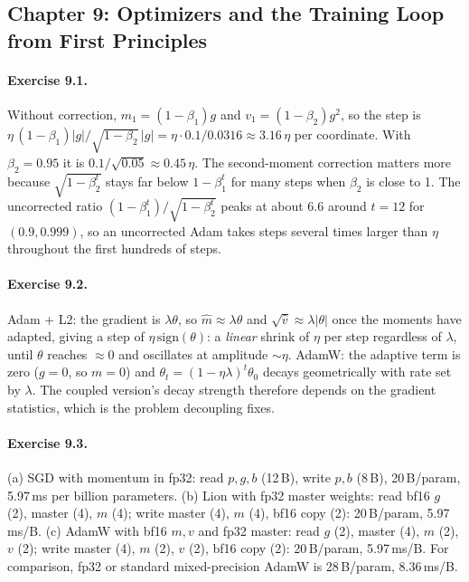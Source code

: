 \subsection*{Chapter 9: Optimizers and the Training Loop from First Principles}

\paragraph{Exercise 9.1.} Without correction, $m_1=(1-\beta_1)g$ and $v_1=(1-\beta_2)g^2$, so
the step is $\eta\,(1-\beta_1)|g|/\sqrt{1-\beta_2}\,|g| = \eta\cdot0.1/0.0316\approx3.16\,\eta$
per coordinate. With $\beta_2=0.95$ it is $0.1/\sqrt{0.05}\approx0.45\,\eta$. The second-moment
correction matters more because $\sqrt{1-\beta_2^t}$ stays far below $1-\beta_1^t$ for many
steps when $\beta_2$ is close to 1. The uncorrected ratio $(1-\beta_1^t)/\sqrt{1-\beta_2^t}$
peaks at about $6.6$ around $t=12$ for $(0.9, 0.999)$, so an uncorrected Adam takes steps
several times larger than $\eta$ throughout the first hundreds of steps.

\paragraph{Exercise 9.2.} Adam + L2: the gradient is $\lambda\theta$, so $\hat m\approx\lambda\theta$
and $\sqrt{\hat v}\approx\lambda|\theta|$ once the moments have adapted, giving a step of
$\eta\,\mathrm{sign}(\theta)$: a \emph{linear} shrink of $\eta$ per step regardless of $\lambda$,
until $\theta$ reaches $\approx0$ and oscillates at amplitude $\sim\eta$. AdamW: the adaptive
term is zero ($g=0$, so $m=0$) and $\theta_t=(1-\eta\lambda)^t\theta_0$ decays geometrically with
rate set by $\lambda$. The coupled version's decay strength therefore depends on the gradient
statistics, which is the problem decoupling fixes.

\paragraph{Exercise 9.3.} (a) SGD with momentum in fp32: read $p,g,b$ (12\,B), write $p,b$
(8\,B), 20\,B/param, 5.97\,ms per billion parameters. (b) Lion with fp32 master weights: read bf16
$g$ (2), master (4), $m$ (4); write master (4), $m$ (4), bf16 copy (2): 20\,B/param, 5.97\,ms/B.
(c) AdamW with bf16 $m,v$ and fp32 master: read $g$ (2), master (4), $m$ (2), $v$ (2); write
master (4), $m$ (2), $v$ (2), bf16 copy (2): 20\,B/param, 5.97\,ms/B. For comparison, fp32 or
standard mixed-precision AdamW is 28\,B/param, 8.36\,ms/B.


